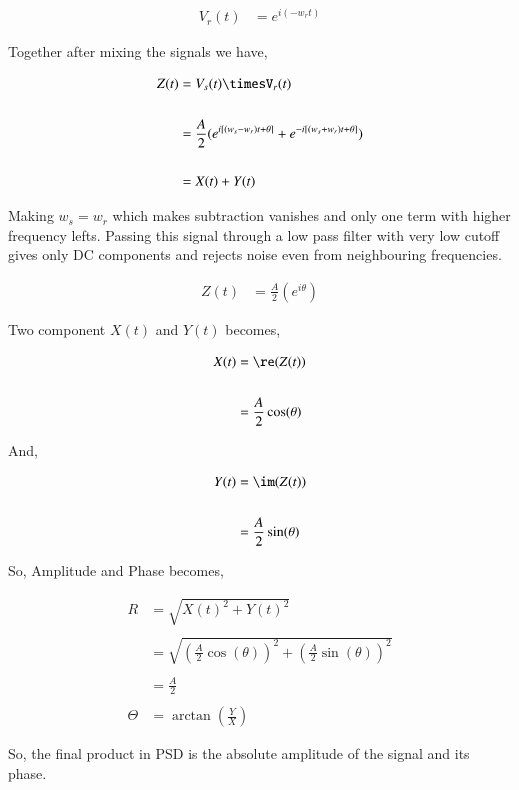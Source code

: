 \begin{align*}
V_r(t) & = e^{i(-w_rt)}
\end{align*}

Together after mixing the signals we have,

\begin{align*}
Z(t) & = V_s(t)\timesV_r(t)\\
\\
& = \frac{A}{2}(e^{i\left[ (w_s-w_r)t+\theta \right]}+e^{-i\left[ (w_s+w_r)t+\theta \right]})\\
\\
& = X(t)+Y(t)
\end{align*}

Making $w_s=w_r$ which makes subtraction vanishes and only one term with higher frequency lefts. Passing this signal through a low pass filter with very low cutoff gives only DC components and rejects noise even from neighbouring frequencies.


\begin{align*}
Z(t) & = \frac{A}{2}(e^{i \theta})
\end{align*}

Two component $X(t)$ and $Y(t)$ becomes,

\begin{align*}
X(t) & =\re(Z(t))\\
\\
& =  \frac{A}{2}\cos(\theta)
\end{align*}

And,

\begin{align*}
Y(t) & = \im(Z(t))\\
\\
& =  \frac{A}{2}\sin(\theta)
\end{align*}

So, Amplitude and Phase becomes, 

\begin{align*}
R & = \sqrt{X(t)^2+Y(t)^2}\\
\\
& =  \sqrt{(\frac{A}{2}\cos(\theta))^2+(\frac{A}{2}\sin(\theta))^2}\\
\\
& = \frac{A}{2}\\
\\
\Theta & = \arctan(\frac{Y}{X})
\end{align*}

So, the final product in PSD is the absolute amplitude of the signal and its phase. 

